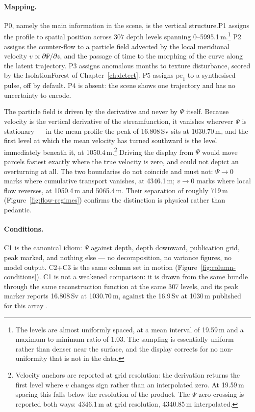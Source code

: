 \paragraph{Mapping.} P0, namely the main information in the scene, is the vertical structure.P1 assigns the profile to spatial position across 307 depth levels spanning 0--5995.1\,m.\footnote{The levels are almost uniformly spaced, at a mean interval of 19.59\,m and a maximum-to-minimum ratio of 1.03. The sampling is essentially uniform rather than denser near the surface, and the display corrects for no non-uniformity that is not in the data.} P2 assigns the counter-flow to a particle field advected by the local meridional velocity $v \propto \partial\Psi/\partial z$, and the passage of time to the morphing of the curve along the latent trajectory. P3 assigns anomalous months to texture disturbance, scored by the IsolationForest of Chapter~\ref{ch:detect}. P5 assigns $\mathrm{pc}_1$ to a synthesised pulse, off by default. P4 is absent: the scene shows one trajectory and has no uncertainty to encode.
 
The particle field is driven by the derivative and never by $\Psi$ itself. Because velocity is the vertical derivative of the streamfunction, it vanishes wherever $\Psi$ is stationary --- in the mean profile the peak of 16.808\,Sv sits at 1030.70\,m, and the first level at which the mean velocity has turned southward is the level immediately beneath it, at 1050.4\,m.\footnote{Velocity anchors are reported at grid resolution: the derivation returns the first level where $v$ changes sign rather than an interpolated zero. At 19.59\,m spacing this falls below the resolution of the product. The $\Psi$ zero-crossing is reported both ways: 4346.1\,m at grid resolution, 4340.85\,m interpolated.} Driving the display from $\Psi$ would move parcels fastest exactly where the true velocity is zero, and could not depict an overturning at all. The two boundaries do not coincide and must not: $\Psi \to 0$ marks where cumulative transport vanishes, at 4346.1\,m; $v \to 0$ marks where local flow reverses, at 1050.4\,m and 5065.4\,m. Their separation of roughly 719\,m (Figure~\ref{fig:flow-regimes}) confirms the distinction is physical rather than pedantic.
 
\paragraph{Conditions.} C1 is the canonical idiom: $\Psi$ against depth, depth downward, publication grid, peak marked, and nothing else --- no decomposition, no variance figures, no model output. C2+C3 is the same column set in motion (Figure~\ref{fig:column-conditions}). C1 is not a weakened comparison: it is drawn from the same bundle through the same reconstruction function at the same 307 levels, and its peak marker reports 16.808\,Sv at 1030.70\,m, against the 16.9\,Sv at 1030\,m published for this array \parencite{smeed2018}.
 
